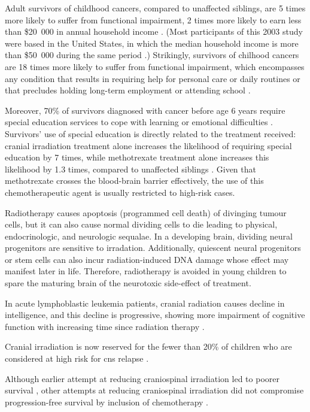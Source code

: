 Adult survivors of childhood cancers, compared to unaffected siblings, are 5 times more likely to suffer from functional impairment, 2 times more likely to earn less than \$20~000 in annual household income . (Most participants of this 2003 study were based in the United States, in which the median household income is more than \$50~000 during the same period .) Strikingly, survivors of chilhood  cancers are 18 times more likely to suffer from functional impairment, which encompasses any condition that results in requiring help for personal care or daily routines or that precludes holding long-term employment or attending school .

Moreover, 70\% of survivors diagnosed with  cancer before age 6 years require special education services to cope with learning or emotional difficulties . Survivors' use of special education is directly related to the treatment received: cranial irradiation treatment alone increases the likelihood of requiring special education by 7 times, while methotrexate treatment alone increases this likelihood by 1.3 times, compared to unaffected siblings . Given that methotrexate crosses the blood-brain barrier effectively, the use of this chemotherapeutic agent is usually restricted to high-risk cases.

Radiotherapy causes apoptosis (programmed cell death) of divinging tumour cells, but it can also cause normal dividing cells to die leading to physical, endocrinologic, and neurologic sequalae. In a developing brain, dividing neural progenitors are sensitive to irradation. Additionally, quiescent neural progenitors or stem cells can also incur radiation-induced DNA damage whose effect may manifest later in life. Therefore, radiotherapy is avoided in young children to spare the maturing brain of the neurotoxic side-effect of treatment.

In acute lymphoblastic leukemia patients, cranial radiation causes decline in intelligence, and this decline is progressive, showing more impairment of cognitive function with increasing time since radiation therapy .

Cranial irradiation is now reserved for the fewer than 20\% of children who are considered at high risk for \gls{cns} relapse .

Although earlier attempt at reducing craniospinal irradiation led to poorer survival , other attempts at reducing craniospinal irradiation did not compromise progression-free survival by inclusion of chemotherapy .

